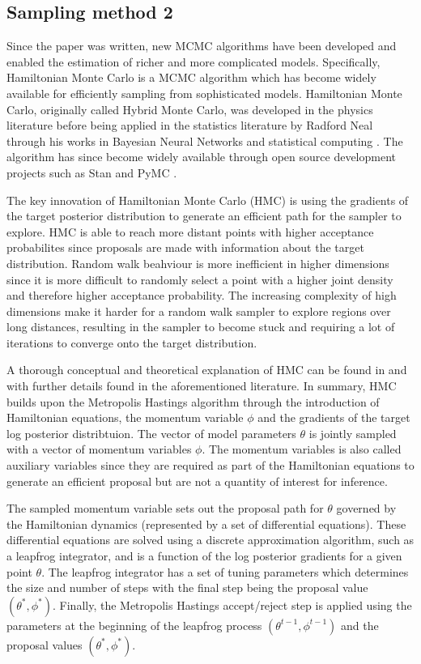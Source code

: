\documentclass[12pt, a4paper]{article}
\begin{document}
    \subsection{Sampling method 2}
        Since the paper was written, new MCMC algorithms have been developed and enabled the estimation of richer and more complicated models. Specifically, Hamiltonian Monte Carlo is a MCMC algorithm which has become widely available for efficiently sampling from sophisticated models. Hamiltonian Monte Carlo, originally called Hybrid Monte Carlo, was developed in the physics literature \citep{duane1987hybrid} before being applied in the statistics literature by Radford Neal through his works in Bayesian Neural Networks \citep{neal1995bayesian} and statistical computing \citep{neal2011mcmc}. The algorithm has since become widely available through open source development projects such as Stan \citep{stan} and PyMC \citep{pymc2023}.


        The key innovation of Hamiltonian Monte Carlo (HMC) is using the gradients of the target posterior distribution to generate an efficient path for the sampler to explore. HMC is able to reach more distant points with higher acceptance probabilites since proposals are made with information about the target distribution. Random walk beahviour is more inefficient in higher dimensions since it is more difficult to randomly select a point with a higher joint density and therefore higher acceptance probability. The increasing complexity of high dimensions make it harder for a random walk sampler to explore regions over long distances, resulting in the sampler to become stuck and requiring a lot of iterations to converge onto the target distribution. 

        A thorough conceptual and theoretical explanation of HMC can be found in \citet{gelman2013bayesian} and \citet{betancourt2017conceptual} with further details found in the aforementioned literature. In summary, HMC builds upon the Metropolis Hastings algorithm through the introduction of Hamiltonian equations, the momentum variable $\phi$ and the gradients of the target log posterior distribtuion. The vector of model parameters $\theta$ is jointly sampled with a vector of momentum variables $\phi$. The momentum variables is also called auxiliary variables since they are required as part of the Hamiltonian equations to generate an efficient proposal but are not a quantity of interest for inference.

        The sampled momentum variable sets out the proposal path for $\theta$ governed by the Hamiltonian dynamics (represented by a set of differential equations). These differential equations are solved using a discrete approximation algorithm, such as a leapfrog integrator, and is a function of the log posterior gradients for a given point $\theta$. The leapfrog integrator has a set of tuning parameters which determines the size and number of steps with the final step being the proposal value $(\theta^{\ast}, \phi^{\ast})$. Finally, the Metropolis Hastings accept/reject step is applied using the parameters at the beginning of the leapfrog process $(\theta^{t-1}, \phi^{t-1})$ and the proposal values $(\theta^{\ast}, \phi^{\ast})$. 
\end{document}
